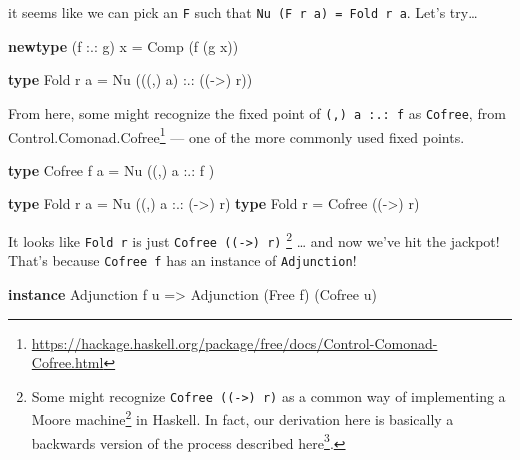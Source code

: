 \documentclass[]{article}
\newenvironment{Shaded}{}{}
\newcommand{\DataTypeTok}[1]{\textcolor[rgb]{0.56,0.13,0.00}{#1}}
\newcommand{\KeywordTok}[1]{\textcolor[rgb]{0.00,0.44,0.13}{\textbf{#1}}}
\newcommand{\NormalTok}[1]{#1}
\newcommand{\OperatorTok}[1]{\textcolor[rgb]{0.40,0.40,0.40}{#1}}
\newcommand{\OtherTok}[1]{\textcolor[rgb]{0.00,0.44,0.13}{#1}}
\renewcommand{\href}[2]{#2\footnote{\url{#1}}}
\begin{document}
it seems like we can pick an \texttt{F} such that
\texttt{Nu\ (F\ r\ a)\ =\ Fold\ r\ a}. Let's try\ldots{}

\begin{Shaded}
\begin{Highlighting}[]
\KeywordTok{newtype}\NormalTok{ (f }\OperatorTok{:.:}\NormalTok{ g) x }\OtherTok{=} \DataTypeTok{Comp}\NormalTok{ (f (g x))}

\KeywordTok{type} \DataTypeTok{Fold}\NormalTok{ r a }\OtherTok{=} \DataTypeTok{Nu}\NormalTok{ (((,) a) }\OperatorTok{:.:}\NormalTok{ ((}\OtherTok{{-}>}\NormalTok{) r))}
\end{Highlighting}
\end{Shaded}

From here, some might recognize the fixed point of \texttt{(,)\ a\ :.:\ f} as
\texttt{Cofree}, from
\href{https://hackage.haskell.org/package/free/docs/Control-Comonad-Cofree.html}{Control.Comonad.Cofree}
--- one of the more commonly used fixed points.

\begin{Shaded}
\begin{Highlighting}[]
\KeywordTok{type} \DataTypeTok{Cofree}\NormalTok{ f a }\OtherTok{=} \DataTypeTok{Nu}\NormalTok{ ((,) a }\OperatorTok{:.:}\NormalTok{ f     )}

\KeywordTok{type} \DataTypeTok{Fold}\NormalTok{ r a   }\OtherTok{=} \DataTypeTok{Nu}\NormalTok{ ((,) a }\OperatorTok{:.:}\NormalTok{ (}\OtherTok{{-}>}\NormalTok{) r)}
\KeywordTok{type} \DataTypeTok{Fold}\NormalTok{ r     }\OtherTok{=} \DataTypeTok{Cofree}\NormalTok{ ((}\OtherTok{{-}>}\NormalTok{) r)}
\end{Highlighting}
\end{Shaded}

It looks like \texttt{Fold\ r} is just \texttt{Cofree\ ((-\textgreater{})\ r)}
\footnote{Some might recognize \texttt{Cofree\ ((-\textgreater{})\ r)} as a
  common way of implementing a
  \href{https://en.wikipedia.org/wiki/Moore_machine}{Moore machine} in Haskell.
  In fact, our derivation here is basically a backwards version of
  \href{https://www.schoolofhaskell.com/user/edwardk/moore/for-less}{the process
  described here}.} \ldots{} and now we've hit the jackpot! That's because
\texttt{Cofree\ f} has an instance of \texttt{Adjunction}!

\begin{Shaded}
\begin{Highlighting}[]
\KeywordTok{instance} \DataTypeTok{Adjunction}\NormalTok{ f u }\OtherTok{=>} \DataTypeTok{Adjunction}\NormalTok{ (}\DataTypeTok{Free}\NormalTok{ f) (}\DataTypeTok{Cofree}\NormalTok{ u)}
\end{Highlighting}
\end{Shaded}
\end{document}
